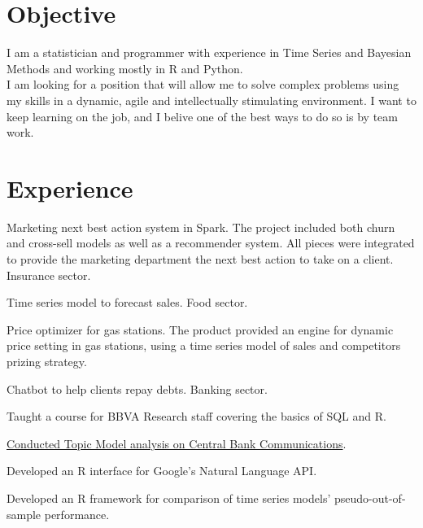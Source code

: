 \documentclass[]{deedy-resume-openfont}
\begin{document}
\begin{minipage}[t]{0.66\textwidth} 


\section{Objective}
I am a statistician and programmer with experience in Time Series and Bayesian Methods and working
mostly in R and Python.\\
I am looking for a position that will allow me to solve complex problems using my skills in a dynamic, agile and 
intellectually stimulating environment. I want to keep learning on the job, and I belive one of the best ways
to do so is by team work.
\sectionsep


\section{Experience}

\vspace{\topsep} %
\begin{tightemize}
\item Marketing next best action system in Spark. The project included both churn and cross-sell
models as well as a recommender system. All pieces were integrated to provide the marketing department the next
best action to take on a client.
Insurance sector.
\item Time series model to forecast sales. Food sector.
\item Price optimizer for gas stations. The product provided an engine for dynamic price setting in gas stations,
using a time series model of sales and competitors prizing strategy.
\item Chatbot to help clients repay debts. Banking sector.
\end{tightemize}
\sectionsep

\begin{tightemize}
\item Taught a course for BBVA Research staff covering the basics of SQL and R.
\item \href{
https://www.bbvaresearch.com/en/publicaciones/how-do-the-emerging-markets-central-bank-talk-a-big-data-approach-to-the-cb-of-turkey/
}
  {Conducted Topic Model analysis on Central Bank Communications}. 
\item Developed an R interface for Google's Natural Language API.
\item Developed an R framework for comparison of time series models' 
  pseudo-out-of-sample performance.
\end{tightemize}
\sectionsep


\end{minipage}
\end{document}
